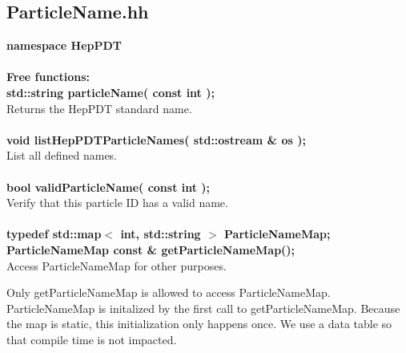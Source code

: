 \documentclass[twoside,12pt]{article}
\begin{document}
\vfill\eject

\subsection {ParticleName.hh}

\begin{tabbing}

{\bf namespace HepPDT} \\  \\

{\bf Free functions:} \\

\hspace{0.5in} {\bf std::string  particleName( const int );} \\
\hspace{0.5in}  Returns the HepPDT standard name. \\ \\

\hspace{0.5in} {\bf void  listHepPDTParticleNames( std::ostream \& os );} \\
\hspace{0.5in} List all defined names.  \\ \\

\hspace{0.5in} {\bf bool validParticleName( const int );} \\
\hspace{0.5in} Verify that this particle ID has a valid name.  \\ \\

\hspace{0.5in} {\bf typedef  std::map$<$ int, std::string $>$  ParticleNameMap;} \\
\hspace{0.5in} {\bf ParticleNameMap const \&  getParticleNameMap();} \\
\hspace{0.5in} Access ParticleNameMap for other purposes.  \\
\end{tabbing}

Only getParticleNameMap is allowed to access ParticleNameMap.
ParticleNameMap is initalized by the first call to getParticleNameMap.
Because the map is static, this initialization only happens once.
We use a data table so that compile time is not impacted.

\vfill\eject
\end{document}
